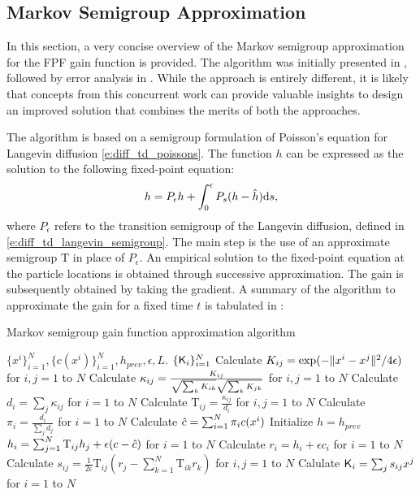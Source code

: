 \subsection{Markov Semigroup Approximation}
\label{s:coifman}
In this section, a very concise overview of the Markov semigroup approximation for the FPF gain function is provided. The algorithm was initially presented in \cite{tagmeh16}, followed by error analysis in \cite{tagmehmey17}. While the approach is entirely different, it is likely that concepts from this concurrent work can provide valuable insights to design an improved solution that combines the merits of both the approaches. 

The algorithm is based on a semigroup formulation of Poisson's equation for Langevin diffusion \eqref{e:diff_td_poissons}. The function $h$ can be expressed as the solution to the following fixed-point equation:
\begin{equation}
h = P_\epsilon h + \int_0^\epsilon P_s (h - {\hat h}) \text{d} s,
\end{equation}
where $P_\epsilon$ refers to the transition semigroup of the Langevin diffusion, defined in \eqref{e:diff_td_langevin_semigroup}. The main step is the use of an approximate semigroup $\text{T}$ in place of $P_\epsilon$.
An empirical solution to the fixed-point equation at the particle locations is obtained through successive approximation. The gain is subsequently obtained by taking the gradient.  A summary of the algorithm to approximate the gain for a fixed time $t$ is tabulated in :
\begin{algorithm}{Markov semigroup gain function approximation algorithm}
\begin{algorithmic}[1]
	\Require $\{x^i\}_{i=1}^N, \{c(x^i)\}_{i=1}^N, h_{prev}, \epsilon, L$.
	\Ensure $\{\text{\sf K}_i\}_{i=1}^N$
	\State Calculate $K_{ij} = \exp(-\|x^i - x^j\|^2/ 4\epsilon)$ for $i,j = 1$ to $N$  
	\State Calculate $\kappa_{ij} = \frac{K_{ij}}{\sqrt{\sum_k K_{ik}}\sqrt{\sum_k K_{jk}}}$ for $i,j =1$ to $N$
	\State Calculate $d_i = \sum_j \kappa_{ij}$ for $i=1$ to $N$
	\State Calculate $\text{T}_{ij} = \frac{\kappa_{ij}}{d_i}$ for $i,j = 1$ to $N$ 
	\State Calculate $\pi_i = \frac{d_i}{\sum_j d_j}$ for $i=1$ to $N$
	\State Calculate $ {\hat c} = \sum_{i = 1}^N \pi_i c(x^i)$
	\State Initialize $h =h_{prev}$
		 \State $h_i = \sum_{j=1}^N \text{T}_{ij} h_j + \epsilon (c - {\hat c})$ for $i=1$ to $N$ 
		\EndFor
	\State Calculate $r_i = h_i + \epsilon c_i$ for $i=1$ to $N$
	\State Calculate $s_{ij} = \frac{1}{2\epsilon} \text{T}_{ij} (r_j - \sum_{k=1}^N \text{T}_{ik} r_k)$ for $i,j=1$ to $N$ 
	\State Calulate $\text{\sf K}_i  = \sum_j s_{ij} x^j$ for $i =1$ to $N$ 
	\label{alg:coifman}
\end{algorithmic}
\end{algorithm}


